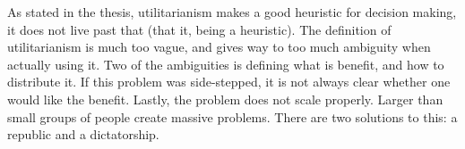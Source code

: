 \documentclass[12pt]{article}
\begin{document}
As stated in the thesis, utilitarianism makes a good heuristic for decision making, it does not live past that (that it, being a heuristic). The definition of utilitarianism is much too vague, and gives way to too much ambiguity when actually using it. Two of the ambiguities is defining what is benefit, and how to distribute it. If this problem was side-stepped, it is not always clear whether one would like the benefit. Lastly, the problem does not scale properly. Larger than small groups of people create massive problems. There are two solutions to this: a republic and a dictatorship.

\theendnotes
\end{document}

